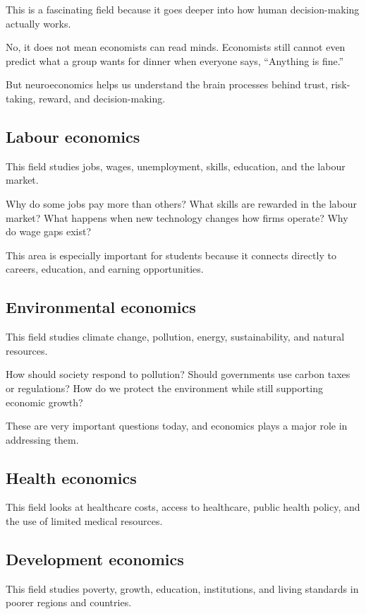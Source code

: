 \documentclass[12pt]{article}
\begin{document}
This is a fascinating field because it goes deeper into how human decision-making actually works.

No, it does not mean economists can read minds. Economists still cannot even predict what a group wants for dinner when everyone says, ``Anything is fine.''

But neuroeconomics helps us understand the brain processes behind trust, risk-taking, reward, and decision-making.

\subsection*{Labour economics}

This field studies jobs, wages, unemployment, skills, education, and the labour market.

Why do some jobs pay more than others? What skills are rewarded in the labour market? What happens when new technology changes how firms operate? Why do wage gaps exist?

This area is especially important for students because it connects directly to careers, education, and earning opportunities.

\subsection*{Environmental economics}

This field studies climate change, pollution, energy, sustainability, and natural resources.

How should society respond to pollution? Should governments use carbon taxes or regulations? How do we protect the environment while still supporting economic growth?

These are very important questions today, and economics plays a major role in addressing them.

\subsection*{Health economics}

This field looks at healthcare costs, access to healthcare, public health policy, and the use of limited medical resources.

\subsection*{Development economics}

This field studies poverty, growth, education, institutions, and living standards in poorer regions and countries.
\end{document}
